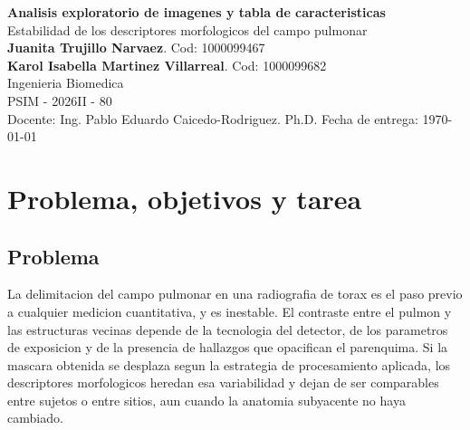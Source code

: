 \documentclass[11pt,a4paper]{article}
\newcommand{\tituloTrabajo}{Analisis exploratorio de imagenes y tabla de caracteristicas}
\newcommand{\subtituloTrabajo}{Estabilidad de los descriptores morfologicos del campo pulmonar}
\begin{document}
\thispagestyle{empty}
\begin{titlepage}
    \centering
    {\LARGE \textbf{\tituloTrabajo}}\\[0.6cm]
    {\large \subtituloTrabajo}\\[2cm]
    {\large \textbf{Juanita Trujillo Narvaez}. Cod: 1000099467}\\
    {\large \textbf{Karol Isabella Martinez Villarreal}. Cod: 1000099682}\\[1cm]
    {\large Ingenieria Biomedica}\\[0.4cm]
    {\large PSIM - 2026II - 80}\\
    Docente: Ing. Pablo Eduardo Caicedo-Rodriguez. Ph.D.
    \vfill
    Fecha de entrega: \today
\end{titlepage}

\tableofcontents
\newpage

\begin{abstract}
Este documento presenta el analisis exploratorio de imagenes del proyecto
semestral. Se audita la procedencia y la calidad de \NImagenesTotal{}
radiografias de torax de dos sitios de adquisicion, se congela una particion
por unidad independiente, se comparan nueve estrategias de segmentacion
clasica contra mascaras de referencia trazadas por personas y se construye
una tabla de \NFilasTabla{} filas con cinco descriptores morfologicos
adimensionales, su valor de referencia y su error relativo. El resultado
principal es negativo y esta sustentado: ninguna estrategia de realce mejora
la linea base sin realce de forma consistente en los dos origenes.
\end{abstract}

\newpage

\section{Problema, objetivos y tarea}

\subsection{Problema}

La delimitacion del campo pulmonar en una radiografia de torax es el paso
previo a cualquier medicion cuantitativa, y es inestable. El contraste entre
el pulmon y las estructuras vecinas depende de la tecnologia del detector, de
los parametros de exposicion y de la presencia de hallazgos que opacifican el
parenquima. Si la mascara obtenida se desplaza segun la estrategia de
procesamiento aplicada, los descriptores morfologicos heredan esa variabilidad
y dejan de ser comparables entre sujetos o entre sitios, aun cuando la
anatomia subyacente no haya cambiado.
\end{document}
